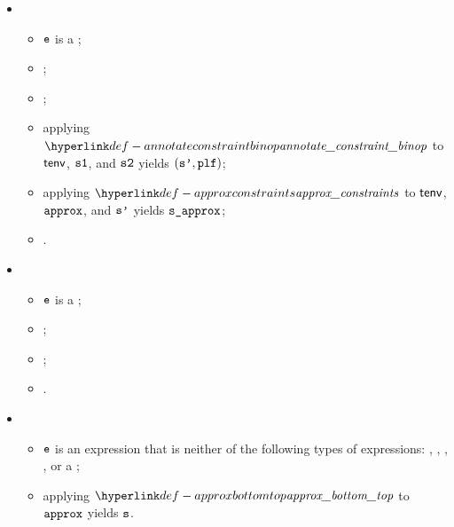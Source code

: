 \begin{itemize}
  \item {}
  \begin{itemize}
    \item $\ve$ is a \binopexpression{$\op$}{$\veone$}{$\vetwo$};
    \item \Proseapproxexpr{$\tenv$}{$\vapprox$}{$\veone$}{$\vsone$};
    \item \Proseapproxexpr{$\tenv$}{$\vapprox$}{$\vetwo$}{$\vstwo$};
    \item applying $\annotateconstraintbinop$ to $\tenv$, $\vsone$, and $\vstwo$ yields $(\vsp, \plf)$;
    \item applying $\approxconstraints$ to $\tenv$, $\vapprox$, and $\vsp$ yields $\vsapprox$;
    \item {}.
  \end{itemize}

  \item {}
  \begin{itemize}
    \item $\ve$ is a ;
    \item \Proseapproxexpr{$\tenv$}{$\vapprox$}{$\vetwo$}{$\vstwo$};
    \item \Proseapproxexpr{$\tenv$}{$\vapprox$}{$\vethree$}{$\vsthree$};
    \item {}.
  \end{itemize}

  \item {}
  \begin{itemize}
    \item $\ve$ is an expression that is neither of the following types of expressions:
          \literalexpressionterm, \variableexpressionterm, \unopexpressionterm, \binopexpressionterm,
          or a \condexpressionterm;
    \item applying $\approxbottomtop$ to $\vapprox$ yields $\vs$.
  \end{itemize}
\end{itemize}

\FormallyParagraph
\begin{mathpar}
\end{mathpar}

